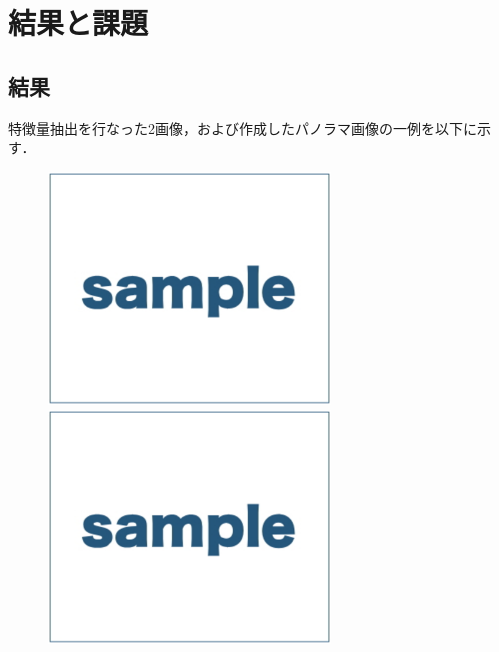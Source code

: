 \section{結果と課題}

\subsection{結果}
特徴量抽出を行なった2画像，および作成したパノラマ画像の一例を以下に示す．\par
\begin{figure}[H]
    \begin{minipage}{0.5\hsize}
        \begin{center}
            \includegraphics[width=75mm]{./figures/section_2/sample.eps}
        \end{center}
    \end{minipage}
    \begin{minipage}{0.5\hsize}
        \begin{center}
            \includegraphics[width=75mm]{./figures/section_2/sample.eps}
        \end{center}
    \end{minipage}
\end{figure}

